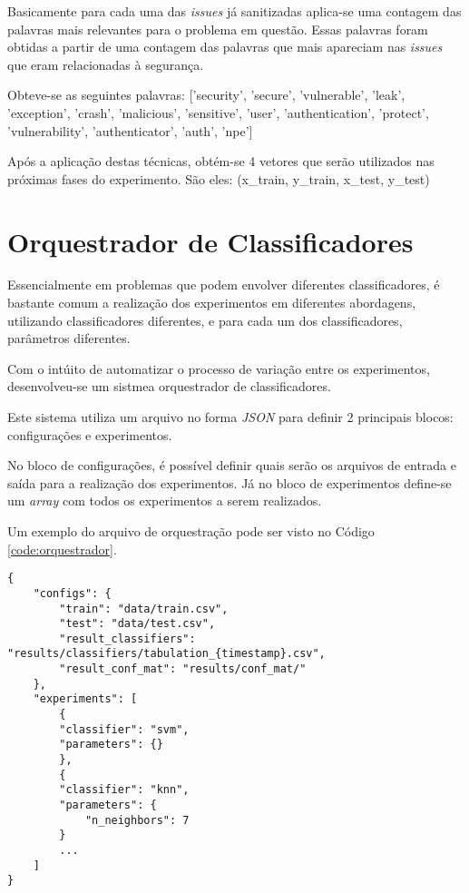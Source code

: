 \documentclass[conference]{IEEEtran}
\begin{document}
Basicamente para cada uma das \textit{issues} já sanitizadas aplica-se uma contagem das palavras mais relevantes para o problema em questão. Essas palavras foram obtidas a partir de uma contagem das palavras que mais apareciam nas \textit{issues} que eram relacionadas à segurança.

Obteve-se as seguintes palavras: ['security', 'secure', 'vulnerable', 'leak', 'exception', 'crash', 'malicious',
'sensitive', 'user', 'authentication', 'protect', 'vulnerability', 'authenticator', 'auth', 'npe']

Após a aplicação destas técnicas, obtém-se 4 vetores que serão utilizados nas próximas fases do experimento. São eles: (x\_train, y\_train, x\_test, y\_test)

\section{Orquestrador de Classificadores}

Essencialmente em problemas que podem envolver diferentes classificadores, é bastante comum a realização dos experimentos em diferentes abordagens, utilizando classificadores diferentes, e para cada um dos classificadores, parâmetros diferentes.

Com o intúito de automatizar o processo de variação entre os experimentos, desenvolveu-se um sistmea orquestrador de classificadores.

Este sistema utiliza um arquivo no forma \textit{JSON} para definir 2 principais blocos: configurações e experimentos.

No bloco de configurações, é possível definir quais serão os arquivos de entrada e saída para a realização dos experimentos. Já no bloco de experimentos define-se um \textit{array} com todos os experimentos a serem realizados.

Um exemplo do arquivo de orquestração pode ser visto no Código \ref{code:orquestrador}.

\begin{lstlisting}[caption={JSON do Orquestrador},captionpos=b,frame=single,label={code:orquestrador}]
{
    "configs": {
        "train": "data/train.csv",
        "test": "data/test.csv",
        "result_classifiers": "results/classifiers/tabulation_{timestamp}.csv",
        "result_conf_mat": "results/conf_mat/"
    },
    "experiments": [
        {
        "classifier": "svm",
        "parameters": {}
        },
        {
        "classifier": "knn",
        "parameters": {
            "n_neighbors": 7
        }
        ...
    ]
}
\end{lstlisting}
\end{document}
